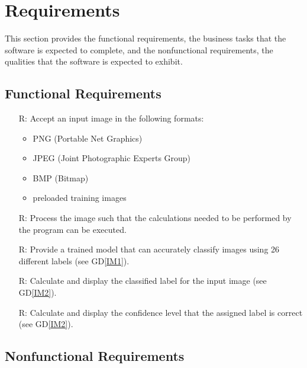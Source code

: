 \documentclass[12pt]{article}
\newcommand{\dref}[1]{GD\ref{#1}}
\newcounter{reqnum} %
\begin{document}
\section{Requirements}

This section provides the functional requirements, the business tasks that the
software is expected to complete, and the nonfunctional requirements, the
qualities that the software is expected to exhibit.

\subsection{Functional Requirements}

\noindent \begin{itemize}

\item[R\refstepcounter{reqnum}\thereqnum \label{R1}:] Accept an input image in the following formats: \begin{itemize}
  \item PNG (Portable Net Graphics)
  \item JPEG (Joint Photographic Experts Group)
  \item BMP (Bitmap)
  \item preloaded training images
\end{itemize}

\item[R\refstepcounter{reqnum}\thereqnum \label{R2}:] Process the image such that the calculations
needed to be performed by the program can be executed.

\item[R\refstepcounter{reqnum}\thereqnum \label{R3}:] Provide a trained model that can accurately classify images using
26 different labels (see \dref{IM1}).

\item[R\refstepcounter{reqnum}\thereqnum \label{R4}:] Calculate and display the classified label for the input image (see \dref{IM2}).

\item[R\refstepcounter{reqnum}\thereqnum \label{R5}:] Calculate and display the confidence level that the assigned
label is correct (see \dref{IM2}).

\end{itemize}

\subsection{Nonfunctional Requirements}
\end{document}
